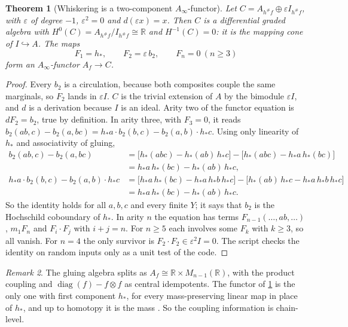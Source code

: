 \documentclass[11pt]{article}
\newtheorem{theorem}{Theorem}[section]
\theoremstyle{definition}
\theoremstyle{remark}
\newtheorem{remark}[theorem]{Remark}
\begin{document}
\begin{theorem}[Whiskering is a two-component $A_\infty$-functor]\label{thm:sqzero}
Let $C=A_{h^\#f}\oplus\varepsilon I_{h^\#f}$, with $\varepsilon$ of degree $-1$, $\varepsilon^2=0$ and $d(\varepsilon x)=x$. Then $C$ is a differential graded
algebra with $H^0(C)=A_{h^\#f}/I_{h^\#f}\cong\mathbb R$ and $H^{-1}(C)=0$: it is the mapping cone of $I\hookrightarrow A$. The maps
\[
F_1=h_*,\qquad F_2=\varepsilon\,b_2,\qquad F_n=0\ (n\ge3)
\]
form an $A_\infty$-functor $A_f\to C$.
\end{theorem}
\begin{proof}
Every $b_2$ is a circulation, because both composites couple the same marginals, so $F_2$ lands in $\varepsilon I$. $C$ is the
trivial extension of $A$ by the bimodule $\varepsilon I$, and $d$ is a derivation because $I$ is an ideal. Arity two of the functor
equation is $dF_2=b_2$, true by definition. In arity three, with $F_3=0$, it reads
$b_2(ab,c)-b_2(a,bc)=h_*a\cdot b_2(b,c)-b_2(a,b)\cdot h_*c$. Using only linearity of $h_*$ and associativity of gluing,
\begin{align*}
b_2(ab,c)-b_2(a,bc)&=\bigl[h_*(abc)-h_*(ab)\,h_*c\bigr]-\bigl[h_*(abc)-h_*a\,h_*(bc)\bigr]\\
&=h_*a\,h_*(bc)-h_*(ab)\,h_*c,\\
h_*a\cdot b_2(b,c)-b_2(a,b)\cdot h_*c&=\bigl[h_*a\,h_*(bc)-h_*a\,h_*b\,h_*c\bigr]-\bigl[h_*(ab)\,h_*c-h_*a\,h_*b\,h_*c\bigr]\\
&=h_*a\,h_*(bc)-h_*(ab)\,h_*c.
\end{align*}
So the identity holds for all $a,b,c$ and every finite $Y$; it says that $b_2$ is the Hochschild coboundary of $h_*$. In
arity $n$ the equation has terms $F_{n-1}(\dots,ab,\dots)$, $m_1F_n$ and $F_i\cdot F_j$ with $i+j=n$. For $n\ge5$ each involves
some $F_k$ with $k\ge3$, so all vanish. For $n=4$ the only survivor is $F_2\cdot F_2\in\varepsilon^2I=0$.
The script checks the identity on random inputs only as a unit test of the code.
\end{proof}

\begin{remark}
The gluing algebra splits as $A_f\cong\mathbb R\times M_{n-1}(\mathbb R)$, with the product coupling and $\operatorname{diag}(f)-f\otimes f$ as
central idempotents. The functor of \cref{thm:sqzero} is the only one with first component $h_*$, for every mass-preserving
linear map in place of $h_*$, and up to homotopy it is the mass \cite{Awasthi-Algebras}. So the coupling information is
chain-level.
\end{remark}
\end{document}

